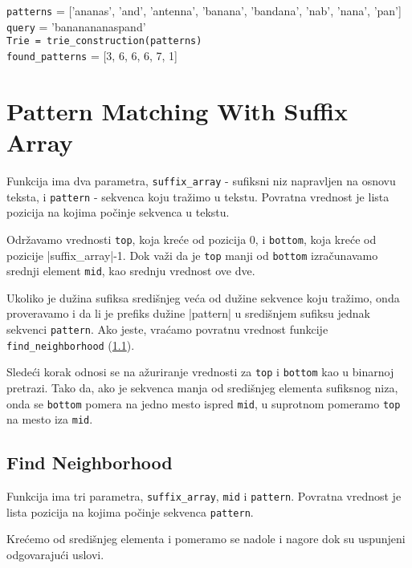 \noindent\texttt{patterns} = ['ananas', 'and', 'antenna', 'banana', 'bandana', 'nab', 'nana', 'pan']
\\\texttt{query} = 'bananananaspand'
\\\texttt{Trie = trie\_construction(patterns)} 
\\\texttt{found\_patterns} = [3, 6, 6, 6, 7, 1] 


\section{Pattern Matching With Suffix Array}

Funkcija ima dva parametra, \texttt{suffix\_array} - sufiksni niz napravljen na osnovu teksta, i \texttt{pattern} - sekvenca koju tražimo u tekstu. Povratna vrednost je lista pozicija na kojima počinje sekvenca u tekstu.

Održavamo vrednosti \texttt{top}, koja kreće od pozicija 0, i \texttt{bottom}, koja kreće od pozicije |suffix\_array|-1. Dok važi da je \texttt{top} manji od \texttt{bottom} izračunavamo srednji element \texttt{mid}, kao srednju vrednost ove dve. 

Ukoliko je dužina sufiksa središnjeg veća od dužine sekvence koju tražimo, onda proveravamo i da li je prefiks dužine |pattern| u središnjem sufiksu jednak sekvenci \texttt{pattern}. Ako jeste, vraćamo povratnu vrednost funkcije \texttt{find\_neighborhood} (\ref{findNeighborhood}). 

Sledeći korak odnosi se na ažuriranje vrednosti za \texttt{top} i \texttt{bottom} kao u binarnoj pretrazi. Tako da, ako je sekvenca manja od središnjeg elementa sufiksnog niza, onda se \texttt{bottom} pomera na jedno mesto ispred \texttt{mid}, u suprotnom pomeramo \texttt{top} na mesto iza \texttt{mid}.




\subsection{Find Neighborhood}
\label{findNeighborhood}


Funkcija ima tri parametra, \texttt{suffix\_array}, \texttt{mid} i \texttt{pattern}. Povratna vrednost je lista pozicija na kojima počinje sekvenca \texttt{pattern}.

Krećemo od središnjeg elementa i pomeramo se nadole i nagore dok su uspunjeni odgovarajući uslovi. 

